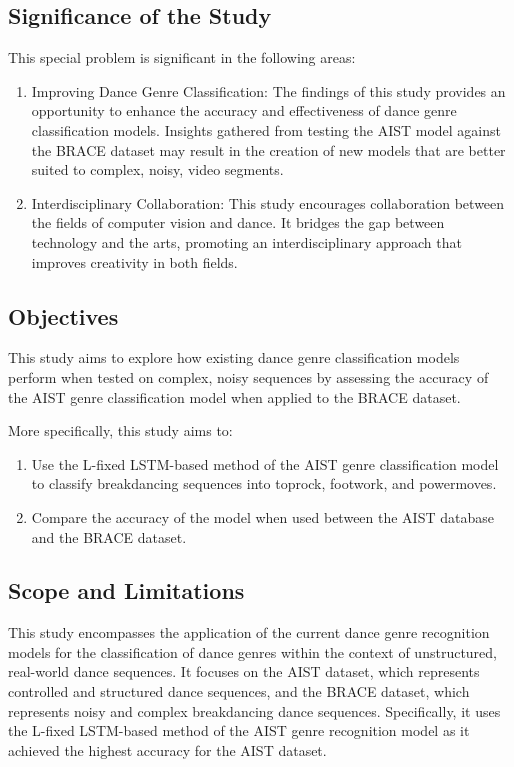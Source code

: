 \documentclass[12pt]{article}
\begin{document}
\subsection{Significance of the Study}
\noindent
\indent
This special problem is significant in the following areas:
\begin{enumerate}
    \item Improving Dance Genre Classification: The findings of this study provides an opportunity to enhance the accuracy and effectiveness of dance genre classification models. Insights gathered from testing the AIST model against the BRACE dataset may result in the creation of new models that are better suited to complex, noisy, video segments.
    \item Interdisciplinary Collaboration: This study encourages collaboration between the fields of computer vision and dance. It bridges the gap between technology and the arts, promoting an interdisciplinary approach that improves creativity in both fields.
\end{enumerate}
\vspace{5mm}



\subsection{Objectives}
\noindent
\par This study aims to explore how existing dance genre classification models perform when tested on complex, noisy sequences by assessing the accuracy of the AIST genre classification model when applied to the BRACE dataset. 
\vspace{5mm}

More specifically, this study aims to:
\begin{enumerate}
    \item Use the L-fixed LSTM-based method of the AIST genre classification model to classify breakdancing sequences into toprock, footwork, and powermoves.
    \item Compare the accuracy of the model when used between the AIST database and the BRACE dataset.
\end{enumerate}


\subsection{Scope and Limitations}
\noindent
\par This study encompasses the application of the current dance genre recognition models for the classification of dance genres within the context of unstructured, real-world dance sequences. It focuses on the AIST dataset, which represents controlled and structured dance sequences, and the BRACE dataset, which represents noisy and complex breakdancing dance sequences. Specifically, it uses the L-fixed LSTM-based method of the AIST genre recognition model as it achieved the highest accuracy for the AIST dataset. 
\vspace{5mm}
\end{document}
